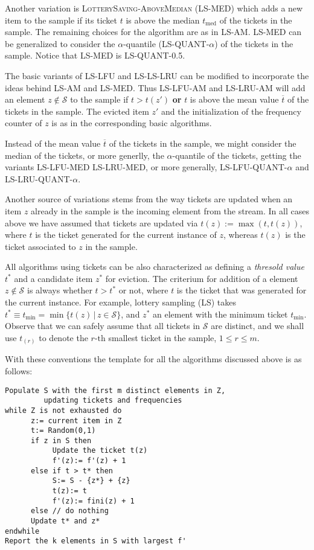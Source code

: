 \documentclass{article}
\newcommand{\esimo}[1]{\text{${#1}$-th}}              %
\begin{document}
Another variation is \textsc{LotterySaving-AboveMedian} (LS-MED) which adds
a new item to the sample if its ticket $t$ is above the median $t_\text{med}$
of the tickets in the sample. The remaining choices for the algorithm are as
in LS-AM. LS-MED can be generalized to consider the $\alpha$-quantile
(LS-QUANT-$\alpha$) of the tickets in the sample. Notice that LS-MED is 
LS-QUANT-0.5.

The basic variants of LS-LFU and LS-LS-LRU can be modified to incorporate
the ideas behind LS-AM and LS-MED.
Thus LS-LFU-AM and LS-LRU-AM will add an element
$z\not\in\mathcal{S}$ to the sample if $t > t(z')$
\textbf{or} $t$ is above the mean value $\overline{t}$ of the tickets
in the sample. The evicted item $z'$ and the initialization of
the frequency counter of $z$ is as in the corresponding basic algorithms.

Instead of the mean value $\overline{t}$ of the tickets in the sample,
we might consider the median of the tickets, or more generlly, the
$\alpha$-quantile of the tickets, getting the variants LS-LFU-MED
LS-LRU-MED, or more generally, LS-LFU-QUANT-$\alpha$ and LS-LRU-QUANT-$\alpha$. 

Another source of variations stems from the way tickets are updated when
an item $z$ already in the sample is the incoming element from the stream.
In all cases above we have assumed that tickets are updated via
$t(z):= \max(t, t(z))$, where $t$ is the ticket generated for the current
instance of $z$, whereas $t(z)$ is the ticket associated to $z$ in the sample.

All algorithms using tickets can be also characterized as defining a
\emph{thresold value} $t^\ast$ and a candidate item $z^\ast$ for eviction. The
criterium for addition of a element $z\not\in\mathcal{S}$ is always whether
$t > t^\ast$ or not, where $t$ is the ticket that was generated for
the current instance.
For example, lottery sampling (LS) takes
$t^\ast\equiv t_\text{min} = \min\{t(z)\,|\,z\in\mathcal{S}\}$,
and $z^\ast$ an element with the
minimum ticket $t_\text{min}$. Observe that we can safely assume that
all tickets in $\mathcal{S}$ are distinct, and we shall use $t_{(r)}$ to
denote the $\esimo{r}$ smallest ticket in the sample, $1\le r\le m$.

With these conventions the template for all the algorithms discussed above is
as follows:
\begin{verbatim}
Populate S with the first m distinct elements in Z, 
         updating tickets and frequencies
while Z is not exhausted do
      z:= current item in Z
      t:= Random(0,1)
      if z in S then
           Update the ticket t(z)
           f'(z):= f'(z) + 1
      else if t > t* then
           S:= S - {z*} + {z}
           t(z):= t
           f'(z):= fini(z) + 1
      else // do nothing
      Update t* and z*
endwhile
Report the k elements in S with largest f'
\end{verbatim}
\end{document}
